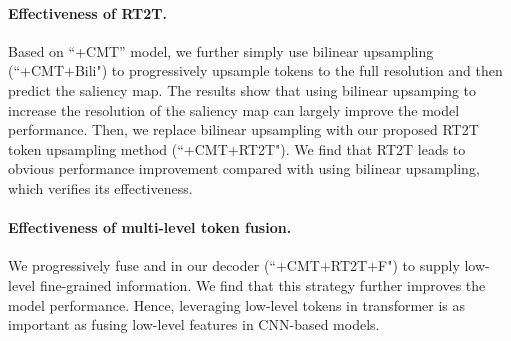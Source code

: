 \documentclass[10pt,twocolumn,letterpaper]{article}
\begin{document}
\vspace{-3mm}
\paragraph{Effectiveness of RT2T.}
Based on ``+CMT'' model, we further simply use bilinear upsampling (``+CMT+Bili") to progressively upsample tokens to the full resolution and then predict the saliency map.
The results show that using bilinear upsamping to increase the resolution of the saliency map can largely improve the model performance.
Then, we replace bilinear upsampling with our proposed RT2T token upsampling method (``+CMT+RT2T"). We find that RT2T leads to obvious performance improvement compared with using bilinear upsampling, which verifies its effectiveness. 


\vspace{-3mm}
\paragraph{Effectiveness of multi-level token fusion.}
We progressively fuse  and  in our decoder (``+CMT+RT2T+F") to supply low-level fine-grained information. We find that this strategy further improves the model performance. Hence, leveraging low-level tokens in transformer is as important as fusing low-level features in CNN-based models.
\end{document}
